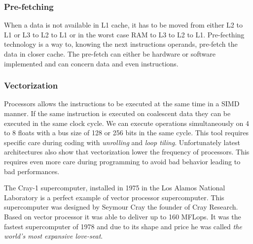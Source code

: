 \subsubsection{Pre-fetching} 
When a data is not available in L1 cache, it has to be moved from either L2 to L1 or L3 to L2 to L1 or in the worst case RAM to L3 to L2 to L1. 
Pre-fecthing technology is a way to, knowing the next instructions operands, pre-fetch the data in closer cache. 
The pre-fetch can either be hardware or software implemented and can concern data and even instructions.

\subsubsection{Vectorization} 
Processors allows the instructions to be executed at the same time in a SIMD manner. 
If the same instruction is executed on coalescent data they can be executed in the same clock cycle. 
We can execute operations simultaneously on 4 to 8 floats with  a bus size of 128 or 256 bits in the same cycle.  
This tool requires specific care during coding with \textit{unrolling} and \textit{loop tiling}. 
Unfortunately latest architectures also show that vectorization lower the frequency of processors. 
This requires even more care during programming to avoid bad behavior leading to bad performances. 

The Cray-1 supercomputer\cite{russell1978cray}, installed in 1975 in the Los Alamos National Laboratory is a perfect example of vector processor supercomputer.
This supercomputer was designed by Seymour Cray the founder of Cray Research.
Based on vector processor it was able to deliver up to 160 MFLops.
It was the fastest supercomputer of 1978 and due to its shape and price he was called \textit{the world's most expansive love-seat}. 

